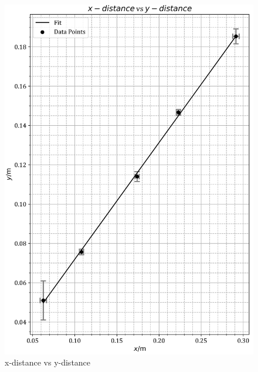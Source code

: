 \documentclass[12pt, a4paper]{article}
\begin{document}
\begin{figure}
    \centering
    \includegraphics[width=\textwidth]{mMgraph.png}
    \caption{x-distance vs y-distance}
    \label{fig:m/M graph}
\end{figure}
\end{document}
